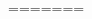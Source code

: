 \documentclass{../../oss-apphys-exam}
\begin{document}
\begin{multicols*}{2}
\begin{questions}
\begin{questions}
{%
%      
%
%
=======
%    
}
\end{questions}
\end{questions}
\end{multicols*}
\end{document}
